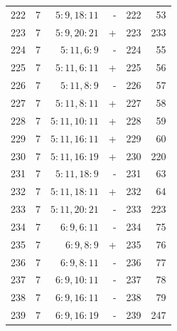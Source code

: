 \begin{center}
\begin{tabular}{rrrrrr}
222 & 7 & $5:9,18:11$ & - & 222 & 53\\
223 & 7 & $5:9,20:21$ & + & 223 & 233\\
224 & 7 & $5:11,6:9$ & - & 224 & 55\\
225 & 7 & $5:11,6:11$ & + & 225 & 56\\
226 & 7 & $5:11,8:9$ & - & 226 & 57\\
227 & 7 & $5:11,8:11$ & + & 227 & 58\\
228 & 7 & $5:11,10:11$ & + & 228 & 59\\
229 & 7 & $5:11,16:11$ & + & 229 & 60\\
230 & 7 & $5:11,16:19$ & + & 230 & 220\\
231 & 7 & $5:11,18:9$ & - & 231 & 63\\
232 & 7 & $5:11,18:11$ & + & 232 & 64\\
233 & 7 & $5:11,20:21$ & - & 233 & 223\\
234 & 7 & $6:9,6:11$ & - & 234 & 75\\
235 & 7 & $6:9,8:9$ & + & 235 & 76\\
236 & 7 & $6:9,8:11$ & - & 236 & 77\\
237 & 7 & $6:9,10:11$ & - & 237 & 78\\
238 & 7 & $6:9,16:11$ & - & 238 & 79\\
239 & 7 & $6:9,16:19$ & - & 239 & 247\\
\bottomrule\end{tabular}\end{center}\clearpage

